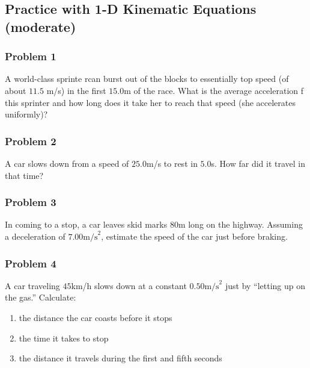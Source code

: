 \documentclass[
  letterpaper,
  DIV=11,
  numbers=noendperiod]{scrartcl}
\providecommand{\tightlist}{%
  \setlength{\itemsep}{0pt}\setlength{\parskip}{0pt}}\usepackage{longtable,booktabs,array}
\begin{document}
\hypertarget{practice-with-1-d-kinematic-equations-moderate}{%
\subsection{Practice with 1-D Kinematic Equations
(moderate)}\label{practice-with-1-d-kinematic-equations-moderate}}

\hypertarget{problem-1-1}{%
\subsubsection{Problem 1}\label{problem-1-1}}

A world-class sprinte rcan burst out of the blocks to essentially top
speed (of about \(11.5\) m/s) in the first \(15.0\)m of the race. What
is the average acceleration f this sprinter and how long does it take
her to reach that speed (she accelerates uniformly)?

\hypertarget{problem-2-1}{%
\subsubsection{Problem 2}\label{problem-2-1}}

A car slows down from a speed of \(25.0\)m/s to rest in \(5.0\)s. How
far did it travel in that time?

\hypertarget{problem-3-1}{%
\subsubsection{Problem 3}\label{problem-3-1}}

In coming to a stop, a car leaves skid marks 80m long on the highway.
Assuming a deceleration of \(7.00 \text{m/s}^2\), estimate the speed of
the car just before braking.

\hypertarget{problem-4-1}{%
\subsubsection{Problem 4}\label{problem-4-1}}

A car traveling \(45\)km/h slows down at a constant
\(0.50 \text{m/s}^2\) just by ``letting up on the gas.'' Calculate:

\begin{enumerate}
\def\labelenumi{(\alph{enumi})}
\tightlist
\item
  the distance the car coasts before it stops
\item
  the time it takes to stop
\item
  the distance it travels during the first and fifth seconds
\end{enumerate}
\end{document}
